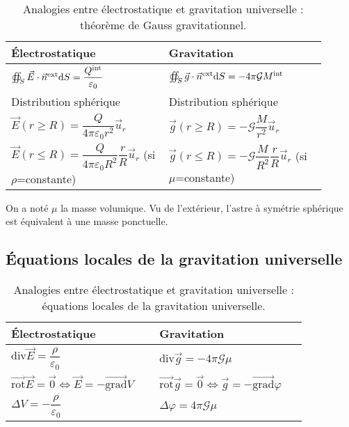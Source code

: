     \begin{table}
        \centering
        \begin{tabular}{p{0.45\linewidth}|p{0.45\linewidth}}
            \toprule
            Électrostatique & Gravitation \\ \midrule
            $\oiint_{S}\vec{E}\cdot\vec{n}^{\text{ext}}\mathrm{d} S=\dfrac{Q^{\text{int}}}{\varepsilon_0}$ & $\oiint_{S}\vec{g}\cdot\vec{n}^{\text{ext}}\mathrm{d} S=-4\pi\mathcal{G}M^{\text{int}}$\\ \midrule
            Distribution sphérique & Distribution sphérique \\ \midrule
            $\vec{E}(r\geqslant R)=\dfrac{Q}{4\pi\varepsilon_0 r^{2}}\vec{u}_r$ & $\vec{g}(r\geqslant R)=-\mathcal{G}\dfrac{M}{r^{2}}\vec{u}_r$\\
            $\vec{E}(r\leqslant R)=\dfrac{Q}{4\pi\varepsilon_0 R^{2}}\dfrac{r}{R}\vec{u}_r$ (si $\rho$=constante) &
            $\vec{g}(r\leqslant R)=-\mathcal{G}\dfrac{M}{R^{2}}\dfrac{r}{R}\vec{u}_r$ (si $\mu$=constante)
            \\ \bottomrule
        \end{tabular}    
        \caption{Analogies entre électrostatique et gravitation universelle : théorème de Gauss gravitationnel.}
        \label{tab:analogie_gravitation_universelle_theoreme_gauss_gravitationnel}
    \end{table}

    On a noté $\mu$ la masse volumique. Vu de l'extérieur, l'astre à symétrie sphérique est équivalent à une masse ponctuelle.

    \subsection{Équations locales de la gravitation universelle}

    \begin{table}
        \centering
        \begin{tabular}{p{0.45\linewidth}|p{0.45\linewidth}}
            \toprule
            Électrostatique & Gravitation \\ \midrule
            $\mathrm{div}\vec{E}=\dfrac{\rho}{\varepsilon_0}$ & $\mathrm{div}\vec{g}=-4\pi\mathcal{G}\mu$ \\ \midrule
            $\vec{\mathrm{rot}}\vec{E}=\vec{0}\Leftrightarrow\vec{E}=-\vec{\mathrm{grad}}V$ & $\vec{\mathrm{rot}}\vec{g}=\vec{0}\Leftrightarrow\vec{g}=-\vec{\mathrm{grad}}\varphi$\\ \midrule
            $\Delta V=-\dfrac{\rho}{\varepsilon_0}$ & $\Delta \varphi=4\pi\mathcal{G}\mu$
            \\ \bottomrule
        \end{tabular}    
        \caption{Analogies entre électrostatique et gravitation universelle : équations locales de la gravitation universelle.}
        \label{tab:analogie_gravitation_universelle_equations_locales_gravitation_universelle}
    \end{table}

